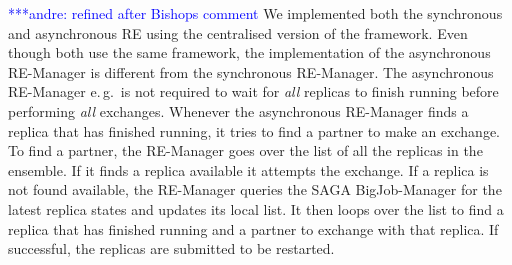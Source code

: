 \documentclass{rspublic}
\newcommand{\jhanote}[1]{ {\textcolor{red} { ***shantenu: #1 }}}
\newcommand{\alnote}[1]{ {\textcolor{blue} { ***andre: #1 }}}
\newcommand{\alnote}[1]{}
\newcommand{\jhanote}[1]{}
\begin{document}
\alnote{refined after Bishops comment}
We implemented both the synchronous and asynchronous RE using the
centralised version of the framework. %
Even though both use the same framework, the implementation of
the asynchronous RE-Manager is different from the synchronous
RE-Manager. The asynchronous RE-Manager e.\,g.\ is not required 
to wait for \emph{all} replicas to finish running before 
performing \emph{all} exchanges. Whenever the asynchronous RE-Manager 
finds a replica that has finished running, it
tries to find a partner to make an exchange. To find a
partner, the RE-Manager goes over the list of all the replicas in the
ensemble. If it finds a replica available it attempts the exchange. If
a replica is not found available, the RE-Manager queries the SAGA
BigJob-Manager for the latest replica states and updates its local
list. It then loops over the list to find a replica that has finished
running and a partner to exchange with that replica.  If successful,
the replicas are submitted to be restarted.





\end{document}
